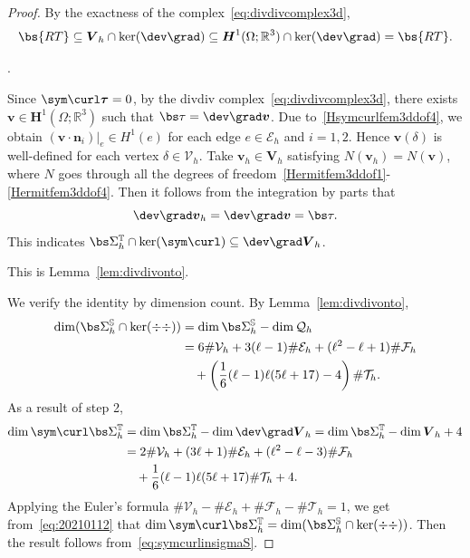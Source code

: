\begin{proof}
\medskip
{} By the exactness of the complex~\eqref{eq:divdivcomplex3d}, 
\[
\bs{RT}\subseteq\boldsymbol V_h \cap\ker(\dev\grad)\subseteq\boldsymbol H^1(\Omega;\mathbb R^3) \cap\ker(\dev\grad)=\bs{RT}.
\]

\medskip
{}. 

Since $\sym\curl\boldsymbol \tau = 0$, by the divdiv complex~\eqref{eq:divdivcomplex3d}, there exists $\boldsymbol v\in\boldsymbol H^1(\Omega;\mathbb R^3)$ such that $\bs\tau=\dev\grad\boldsymbol v$.
Due to~\eqref{Hsymcurlfem3ddof4}, we obtain $(\boldsymbol v\cdot\boldsymbol n_i)|_e\in H^1(e)$ for each edge $e\in\mathcal E_h$ and $i=1,2$. Hence $\boldsymbol v(\delta)$ is well-defined for each vertex $\delta\in\mathcal V_h$. 
Take $\boldsymbol v_h\in\boldsymbol V_h$ satisfying
$
N(\boldsymbol v_h)=N(\boldsymbol v)
$, where $N$ goes through all the degrees of freedom~\eqref{Hermitfem3ddof1}-\eqref{Hermitfem3ddof4}.
Then it follows from the integration by parts that
$$
\dev\grad\boldsymbol v_h=\dev\grad\boldsymbol v=\bs\tau.
$$
This indicates $\bs\Sigma_h^{\mathbb T}\cap\ker(\sym\curl)\subseteq\dev\grad\boldsymbol V_h$.

\medskip
{} This is Lemma~\ref{lem:divdivonto}.


\medskip
{} 

We verify the identity by dimension count. By Lemma~\ref{lem:divdivonto},
\begin{align}
\dim(\bs\Sigma_h^{\mathbb S}\cap\ker(\div\div))&=\dim\bs\Sigma_h^{\mathbb S}-\dim\mathcal Q_h \notag\\
&= 6\#\mathcal V_h+ 3(\ell-1)\#\mathcal E_h + (\ell^2 -\ell+1)\#\mathcal F_h \notag \\
&\quad+\left(\frac{1}{6}(\ell-1)\ell(5\ell+17)-4\right)\#\mathcal T_h. \label{eq:20210112}
\end{align}
As a result of step 2,
\begin{align*}
\dim\sym\curl\bs\Sigma_h^{\mathbb T}&=\dim\bs\Sigma_h^{\mathbb T} -\dim\dev\grad\boldsymbol V_h=\dim\bs\Sigma_h^{\mathbb T} -\dim\boldsymbol V_h+4 \\
&=2\#\mathcal V_h+ (3\ell+1)\#\mathcal E_h + (\ell^2-\ell-3)\#\mathcal F_h \\
&\quad+\frac{1}{6}(\ell-1)\ell(5\ell+17)\#\mathcal T_h+4.
\end{align*}
Applying the Euler's formula $\#\mathcal V_h-\#\mathcal E_h+\#\mathcal F_h-\#\mathcal T_h=1$, we get from~\eqref{eq:20210112} that $\dim\sym\curl\bs\Sigma_h^{\mathbb T}=\dim(\bs\Sigma_h^{\mathbb S}\cap\ker(\div\div))$.
Then the result follows from~\eqref{eq:symcurlinsigmaS}. 


\end{proof}
